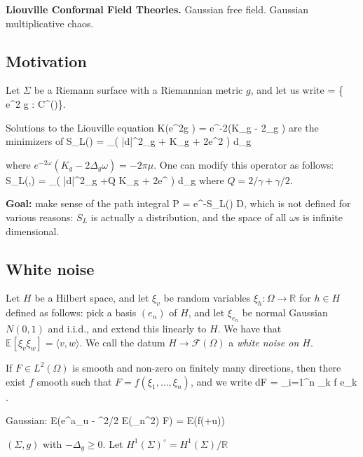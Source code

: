 \documentclass[fleqn,a4paper, twoside]{article}
\makeatletter
\newcommand{\0}{\langle 0\rangle}
\let\[\@undefined
\DeclareRobustCommand{\[}{\begin{equation}}%
\let\]\@undefined
\DeclareRobustCommand{\]}{\end{equation}}%
\theoremstyle{mytheorem}
\theoremstyle{introthm}
\theoremstyle{mydefinition}
\theoremstyle{mydefinition2}
\theoremstyle{plain} %
\newcommand{\?}{\,?\,}
\theoremstyle{mytheorem}
\theoremstyle{plain} %
\makeatother
\begin{document}
 \textbf{Liouville Conformal Field Theories.} 
  Gaussian free field.
 Gaussian multiplicative chaos.
 
\subsection{Motivation}

Let $\Sigma$ be a Riemann surface with a Riemannian
metric $g$, and let us write
\[ [g] = \{ e^{2\omega} g : \omega \in C^\infty(\Sigma)\}. \]
 
 Solutions to the Liouville equation
 \[ K(e^{2\omega}g ) = e^{-2\omega}(K_g - 2\Delta_g \omega)\]
 are the minimizers of
 \[ S_L(\omega) = 
 	 \int_\Sigma \left(
 		|d\omega|^2_g + K_g \omega
 	 	+ 2\pi \mu e^{2\sigma} \right) d_g\]
 	 	
 	 	where $e^{-2\omega}(K_g- 2\Delta_g \omega) = -2\pi \mu$. One can modify this operator as follows:
 	  	 	\[ S_L(\omega,\gamma) = 
 	 \int_\Sigma \left(
 		|d\omega|^2_g +Q  K_g \omega
 	 	+ 2\pi \mu e^{\gamma\sigma} \right) d_g\]
 	 	where $Q =2/\gamma+\gamma/2$. 
 	 	
 	 	\textbf{Goal:} make sense of the path integral
 	 	\[ P = \int e^{-S_L(\omega)} D\omega ,\] 
 	 	which is not defined for various reasons: $S_L$ is
 	 	actually a distribution, and the space of all $\omega$s
 	 	is infinite dimensional.
 	 	
 	 	\subsection{White noise}
 	 	
 	 	Let $H$ be a Hilbert space, and let $\xi_v$ be
 	 	random variables $\xi_h : \Omega \longrightarrow 
 	 	\mathbb R$ for $h\in H$ defined as follows: pick
 	 	a basis $(e_n)$ of $H$, and let $\xi_{e_n}$
 	 	be normal Gaussian $N(0,1)$ and i.i.d., and extend this
 	 	linearly to $H$. We have that
 	 	$
 	 	 \mathbb E[\xi_v\xi_w] = \langle v,w\rangle.
 	 	 $
 	 	We call the datum $H \longrightarrow \mathcal F(\Omega)$
 	 	a \emph{white noise on $H$}.  
 	 	
 	 	If $F\in L^2(\Omega)$ is smooth and non-zero on
 	 	finitely many directions, then there exist $f$
 	 	smooth such that $F = f(\xi_1,\ldots,\xi_n)$, 
 	 	and we write
 	 	\[ dF = \sum_{i=1}^n \partial_k f e_k .\]
 	 	
 	 	Gaussian: 
 	 	\[ 
 	 	\mathbb E(e^{a\xi_u - \alpha^2/2 \mathbb E(\xi_n^2)} F)
 	 	 = \mathbb E(f(\xi+\alpha u))
 	 	\]
 	 	
 	 	$(\Sigma,g)$ with $-\Delta_g \geqslant 0$. Let
 	 	$H^1(\Sigma)^\circ = H^1(\Sigma)/\mathbb R$  
\end{document}
